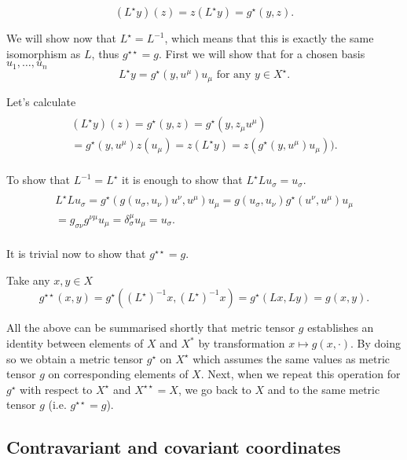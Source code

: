 \documentclass[main.tex]{subfiles}
\begin{document}
\begin{equation}
(L^\star y)(z) = z(L^\star y) = g^\star(y, z).
\end{equation}

We will show now that $L^\star = L^{-1}$, which means that this is exactly the same isomorphism as $L$, thus $g^{\star\star} = g$.  First we will show that for a chosen basis $u_1, \dots, u_n$
\begin{equation}
L^\star y = g^\star(y, u^\mu) u_\mu \text{ for any } y\in X^\star.
\end{equation}

Let's calculate
\begin{multline}
\\
(L^\star y)(z) = g^\star(y, z) = g^\star(y, z_\mu u^\mu)\\ 
= g^\star(y, u^\mu) z(u_\mu) = z(L^\star y) =
z(g^\star(y, u^\mu) u_\mu)). \\
\end{multline}

To show that $L^{-1} = L^\star$ it is enough to show that $L^\star L u_\sigma = u_\sigma$.
\begin{multline*}\\
L^\star L u_\sigma = g^\star(g(u_\sigma, u_\nu)u^\nu, u^\mu)u_\mu = g(u_\sigma, u_\nu) g^\star(u^\nu, u^\mu)u_\mu\\
 = g_{\sigma \nu} g^{\nu\mu} u_\mu = \delta_\sigma^\mu u_\mu = u_\sigma.
\\
\end{multline*}

It is trivial now to show that $g^{\star\star} = g$.

Take any $x, y\in X$ 
\begin{equation}
g^{\star\star}(x, y) = g^\star((L^\star)^{-1}x, (L^\star)^{-1}x) = g^\star(Lx, Ly) = g(x, y).
\end{equation}

All the above can be summarised shortly that metric tensor $g$ establishes an identity between elements of $X$ and $X^*$ by transformation $x\mapsto g(x, \cdot)$. By doing so we obtain a metric tensor $g^\star$ on $X^\star$ which assumes the same values as metric tensor $g$ on corresponding elements of $X$. Next, when we repeat this operation for $g^\star$ with respect to $X^\star$ and $X^{\star\star} = X$, we go back to $X$ and to the same metric tensor $g$ (i.e. $g^{\star\star} = g$).

\subsection{Contravariant and covariant coordinates}
\end{document}

